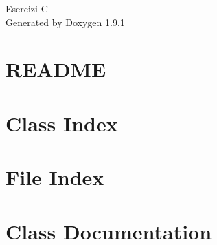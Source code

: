 \let\mypdfximage\pdfximage\def\pdfximage{\immediate\mypdfximage}\documentclass[twoside]{book}
\newcommand{\+}{\discretionary{\mbox{\scriptsize$\hookleftarrow$}}{}{}}
\newcommand{\clearemptydoublepage}{%
  \newpage{\pagestyle{empty}\cleardoublepage}%
}
\begin{document}
\raggedbottom

\hypersetup{pageanchor=false,
             bookmarksnumbered=true,
             pdfencoding=unicode
            }
\begin{titlepage}
\vspace*{7cm}
\begin{center}%
{\Large Esercizi C }\\
\vspace*{1cm}
{\large Generated by Doxygen 1.9.1}\\
\end{center}
\end{titlepage}
\clearemptydoublepage
{}
\tableofcontents
\clearemptydoublepage
{}
\hypersetup{pageanchor=true}

\chapter{README}
\label{md_README}

\chapter{Class Index}

\chapter{File Index}

\chapter{Class Documentation}











\end{document}
